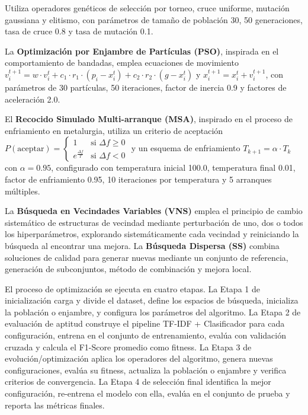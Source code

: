 Utiliza operadores genéticos de selección por torneo, cruce uniforme, mutación gaussiana y elitismo, con parámetros de tamaño de población 30, 50 generaciones, tasa de cruce 0.8 y tasa de mutación 0.1.

La \textbf{Optimización por Enjambre de Partículas (PSO)}, inspirada en el comportamiento de bandadas, emplea ecuaciones de movimiento $v_{i}^{t+1} = w \cdot v_{i}^{t} + c_1 \cdot r_1 \cdot (p_{i} - x_{i}^{t}) + c_2 \cdot r_2 \cdot (g - x_{i}^{t})$ y $x_{i}^{t+1} = x_{i}^{t} + v_{i}^{t+1}$, con parámetros de 30 partículas, 50 iteraciones, factor de inercia 0.9 y factores de aceleración 2.0.

El \textbf{Recocido Simulado Multi-arranque (MSA)}, inspirado en el proceso de enfriamiento en metalurgia, utiliza un criterio de aceptación $P(\text{aceptar}) = \begin{cases} 1 & \text{si } \Delta f \geq 0 \\ e^{\frac{\Delta f}{T}} & \text{si } \Delta f < 0 \end{cases}$ y un esquema de enfriamiento $T_{k+1} = \alpha \cdot T_k$ con $\alpha = 0.95$, configurado con temperatura inicial 100.0, temperatura final 0.01, factor de enfriamiento 0.95, 10 iteraciones por temperatura y 5 arranques múltiples.

La \textbf{Búsqueda en Vecindades Variables (VNS)} emplea el principio de cambio sistemático de estructuras de vecindad mediante perturbación de uno, dos o todos los hiperparámetros, explorando sistemáticamente cada vecindad y reiniciando la búsqueda al encontrar una mejora. La \textbf{Búsqueda Dispersa (SS)} combina soluciones de calidad para generar nuevas mediante un conjunto de referencia, generación de subconjuntos, método de combinación y mejora local.

El proceso de optimización se ejecuta en cuatro etapas. La Etapa 1 de inicialización carga y divide el dataset, define los espacios de búsqueda, inicializa la población o enjambre, y configura los parámetros del algoritmo. La Etapa 2 de evaluación de aptitud construye el pipeline TF-IDF + Clasificador para cada configuración, entrena en el conjunto de entrenamiento, evalúa con validación cruzada y calcula el F1-Score promedio como fitness. La Etapa 3 de evolución/optimización aplica los operadores del algoritmo, genera nuevas configuraciones, evalúa su fitness, actualiza la población o enjambre y verifica criterios de convergencia. La Etapa 4 de selección final identifica la mejor configuración, re-entrena el modelo con ella, evalúa en el conjunto de prueba y reporta las métricas finales.

